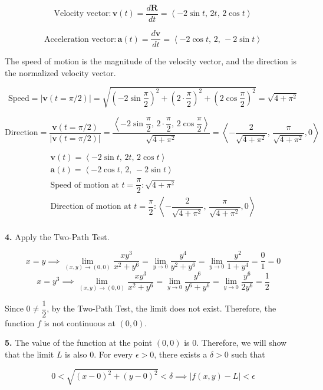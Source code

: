\documentclass{article}
\begin{document}
\[\text{Velocity vector}:\mathbf v(t)=\frac{d\mathbf R}{dt}=\left\langle-2\sin t,\,2t,\,2\cos t\right\rangle\]

\[\text{Acceleration vector}:\mathbf a(t)=\frac{d\mathbf v}{dt}=\left\langle-2\cos t,\,2,\,-2\sin t\right\rangle\]

The speed of motion is the magnitude of the velocity vector, and the direction is the normalized velocity vector.

\[\text{Speed}=\left|\mathbf v(t=\pi/2)\right|=\sqrt{\left(-2\sin\frac\pi2\right)^2+\left(2\cdot\frac\pi2\right)^2+\left(2\cos\frac\pi2\right)^2}=\sqrt{4+\pi^2}\]

\[\text{Direction}=\frac{\mathbf v(t=\pi/2)}{\left|\mathbf v(t=\pi/2)\right|}=\frac{\left\langle-2\sin\dfrac\pi2,\,2\cdot\dfrac\pi2,\,2\cos\dfrac\pi2\right\rangle}{\sqrt{4+\pi^2}}=\left\langle-\frac2{\sqrt{4+\pi^2}},\,\frac\pi{\sqrt{4+\pi^2}},0\right\rangle\]

\[\boxed{\begin{array}{c}
\mathbf v(t)=\left\langle-2\sin t,\,2t,\,2\cos t\right\rangle\\
\mathbf a(t)=\left\langle-2\cos t,\,2,\,-2\sin t\right\rangle\\[1em]
\text{Speed of motion at }t=\dfrac\pi2:\sqrt{4+\pi^2}\\
\text{Direction of motion at }t=\dfrac\pi2:\left\langle-\dfrac2{\sqrt{4+\pi^2}},\,\dfrac\pi{\sqrt{4+\pi^2}},0\right\rangle\\
\end{array}}\]

\newpage

\textbf{4.} Apply the Two-Path Test.

\[x=y\implies\lim_{(x,y)\to(0,0)}\frac{xy^3}{x^2+y^6}=\lim_{y\to0}\frac{y^4}{y^2+y^6}=\lim_{y\to0}\frac{y^2}{1+y^4}=\frac01=0\]
\[x=y^3\implies\lim_{(x,y)\to(0,0)}\frac{xy^3}{x^2+y^6}=\lim_{y\to0}\frac{y^6}{y^6+y^6}=\lim_{y\to0}\frac{y^6}{2y^6}=\frac12\]

Since $0\neq\dfrac12$, by the Two-Path Test, the limit does not exist. Therefore, the function $f$ is not continuous at $(0,0)$.

\vspace{1em}

\textbf{5.} The value of the function at the point $(0,0)$ is $0$. Therefore, we will show that the limit $L$ is also $0$. For every $\epsilon>0$, there exists a $\delta>0$ such that

\[0<\sqrt{(x-0)^2+(y-0)^2}<\delta\implies\left|f(x,y)-L\right|<\epsilon\]
\end{document}
